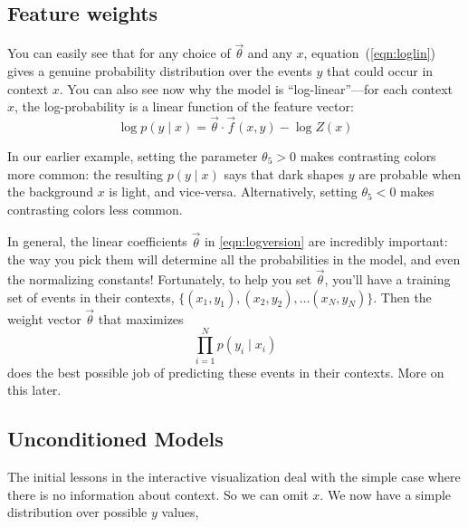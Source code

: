\documentclass[11pt]{article}
\newcommand{\vtheta}{\vec{\theta}}
\begin{document}
\subsection{Feature weights}

You can easily see that for any choice of $\vtheta$ and any $x$,
equation~(\ref{eqn:loglin}) gives a genuine probability distribution
over the events $y$ that could occur in context $x$.  You can also see
now why the model is ``log-linear''---for each context $x$, the
log-probability is a linear function of the feature vector:
\begin{equation}\label{eqn:logversion}
\log p(y \mid x) = \vtheta \cdot \vec{f}(x,y) - \log Z(x)
\end{equation}


In our earlier example, setting the parameter $\theta_5 > 0$ makes
contrasting colors more common: the resulting $p(y \mid x)$ says
that dark shapes $y$ are probable when the background $x$ is light,
and vice-versa.  Alternatively, setting $\theta_5 < 0$ makes
contrasting colors less common.

\medskip
In general, the linear coefficients $\vtheta$ in \eqref{eqn:logversion} are incredibly
important: the way you pick them will determine all the probabilities
in the model, and even the normalizing constants!  Fortunately, to
help you set $\vtheta$, you'll have a training set of events in their
contexts, $\{(x_1,y_1), (x_2,y_2), \ldots (x_N,y_N)\}$.  Then the
weight vector $\vtheta$ that maximizes
\begin{equation}\label{eqn:loglin-likelihood}
\prod_{i=1}^N p(y_i \mid x_i)
\end{equation}
does the best possible job of predicting these events in their
contexts.  More on this later.

\subsection{Unconditioned Models}\label{sec:unconditioned}

The initial lessons in the interactive visualization deal with the
simple case where there is no information about context.  So we can
omit $x$.  We now have a simple distribution over possible $y$ values,
\end{document}
